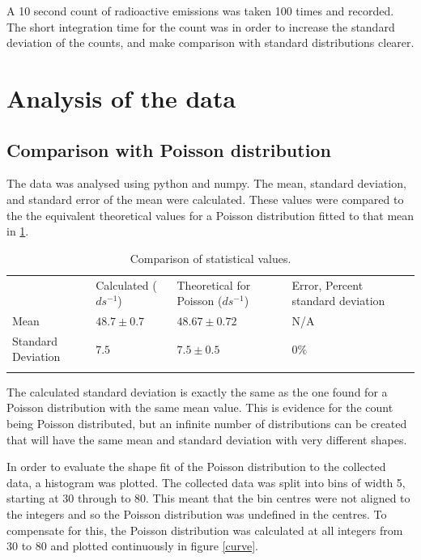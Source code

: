 \documentclass[10pt]{iopart}
\begin{document}
A 10 second count of radioactive emissions was taken 100 times and recorded. The short integration time for the count was in order to increase the standard deviation of the counts, and make comparison with standard distributions clearer.




\section{Analysis of the data}

\subsection{Comparison with Poisson distribution}

The data was analysed using python and numpy. The mean, standard deviation, and standard error of the mean were calculated. These values were compared to the the equivalent theoretical values for a Poisson distribution fitted to that mean in \ref{statcomptable}.
\begin{table}[h]
\caption{Comparison of statistical values.}
\label{statcomptable}
\begin{tabular}{lllll}
                   & Calculated ($ds^{-1}$) & Theoretical for Poisson ($ds^{-1}$) & Error, Percent standard deviation &  \\
Mean               & $48.7\pm0.7$   & $48.67\pm0.72$               & N/A                               &  \\
Standard Deviation & $7.5$        & $7.5\pm0.5$                  & $0\%$                               &  \\
                   &            &                          &                                   & 
\end{tabular}
\end{table}

The calculated standard deviation is exactly the same as the one found for a Poisson distribution with the same mean value. This is evidence for the count being Poisson distributed, but an infinite number of distributions can be created that will have the same mean and standard deviation\cite{labbook} with very different shapes.

In order to evaluate the shape fit of the Poisson distribution to the collected data, a histogram was plotted.
The collected data was split into bins of width 5, starting at 30 through to 80. This meant that the bin centres  were not aligned to the integers and so the Poisson distribution was undefined in the centres. To compensate for this, the Poisson distribution was calculated at all integers from 30 to 80 and plotted continuously in figure \ref{curve}.
\end{document}
